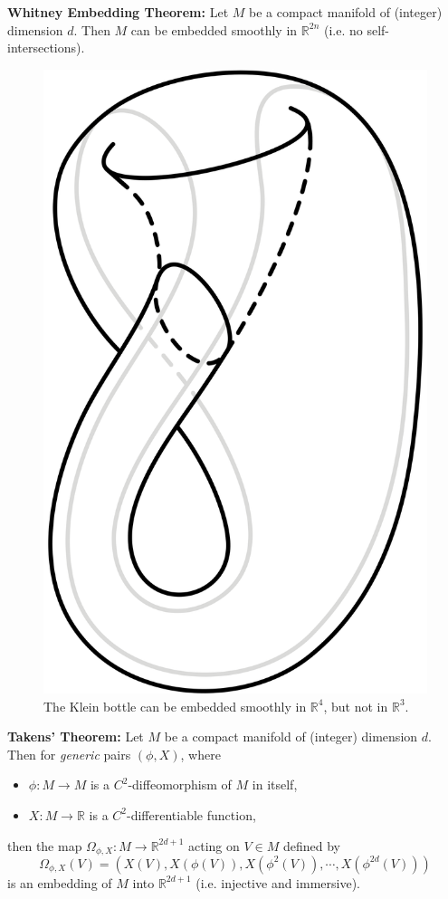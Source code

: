 \documentclass[12pt]{article}
\theoremstyle{definition}
\theoremstyle{remark}
\begin{document}
\textbf{Whitney Embedding Theorem:}
Let $M$ be a compact manifold of (integer) dimension $d$. Then $M$ can be embedded smoothly in $\mathbb{R}^{2n}$ (i.e. no self-intersections).

\begin{figure}[H]
    \centering
    \includegraphics[scale=0.1]{figures/klein_bottle.png}
    \caption{The Klein bottle can be embedded smoothly in $\mathbb R^4$, but not in $\mathbb R^3$.}
\end{figure}

\textbf{Takens' Theorem:}
Let $M$ be a compact manifold of (integer) dimension $d$. Then for \textit{generic} pairs $(\phi, X)$, where
\begin{itemize}
    \item $\phi : M \to M$ is a $C^2$-diffeomorphism of $M$ in itself,
    \item $X : M \to \mathbb R$ is a $C^2$-differentiable function,
\end{itemize}
then the map $\Omega_{\phi, X} : M \to \mathbb R^{2d + 1}$ acting on $V \in M$ defined by
\[ \Omega_{\phi, X}(V) = ( X(V), X(\phi(V)), X(\phi^2(V)), \cdots, X(\phi^{2d}(V))) \]
is an embedding of $M$ into $\mathbb{R}^{2d+1}$ (i.e. injective and immersive).
\end{document}

